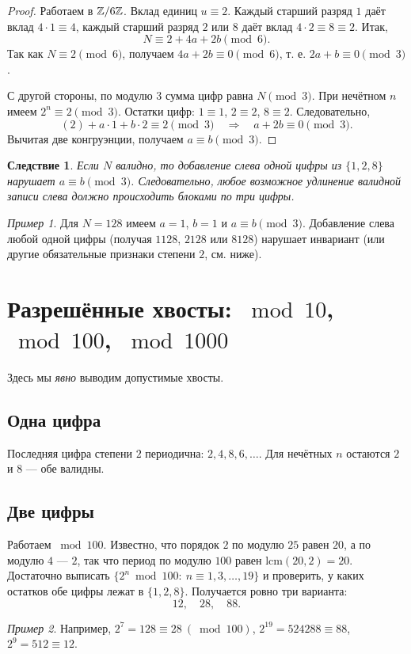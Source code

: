 \documentclass[12pt]{article}
\theoremstyle{plain}
\newtheorem{corollary}{Следствие}
\theoremstyle{remark}
\newtheorem*{example}{Пример}
\begin{document}
\begin{proof}
Работаем в $\Bbb Z/6\Bbb Z$. Вклад единиц $u\equiv2$. Каждый старший разряд $1$ даёт вклад $4\cdot1\equiv4$, каждый старший разряд $2$ или $8$ даёт вклад $4\cdot2\equiv8\equiv2$. Итак,
\[
N\equiv 2 + 4a + 2b \pmod6.
\]
Так как $N\equiv2\pmod6$, получаем $4a+2b\equiv0\pmod6$, т. е. $2a+b\equiv0\pmod3$.

С другой стороны, по модулю $3$ сумма цифр равна $N\pmod3$. При нечётном $n$ имеем $2^n\equiv2\pmod3$. Остатки цифр: $1\equiv1$, $2\equiv2$, $8\equiv2$. Следовательно,
\[
(2) + a\cdot1 + b\cdot2 \equiv 2 \pmod3 \quad\Rightarrow\quad a+2b\equiv0\pmod3.
\]
Вычитая две конгруэнции, получаем $a\equiv b\pmod3$.
\end{proof}

\begin{corollary}\label{cor:blocks}
Если $N$ валидно, то добавление слева одной цифры из $\{1,2,8\}$ нарушает $a\equiv b\pmod3$. Следовательно, любое возможное удлинение валидной записи слева должно происходить блоками по три цифры.
\end{corollary}

\begin{example}
Для $N=128$ имеем $a=1$, $b=1$ и $a\equiv b\pmod3$. Добавление слева любой одной цифры (получая $1128$, $2128$ или $8128$) нарушает инвариант (или другие обязательные признаки степени $2$, см. ниже).
\end{example}

\section{Разрешённые хвосты: \texorpdfstring{$\bmod 10$}{mod 10}, \texorpdfstring{$\bmod 100$}{mod 100}, \texorpdfstring{$\bmod 1000$}{mod 1000}}
Здесь мы \emph{явно} выводим допустимые хвосты.

\subsection*{Одна цифра}
Последняя цифра степени $2$ периодична: $2,4,8,6,\ldots$. Для нечётных $n$ остаются $2$ и $8$ — обе валидны.

\subsection*{Две цифры}
Работаем $\bmod 100$. Известно, что порядок $2$ по модулю $25$ равен $20$, а по модулю $4$ — $2$, так что период по модулю $100$ равен $\mathrm{lcm}(20,2)=20$. Достаточно выписать $\{2^n\bmod100:\ n\equiv1,3,\ldots,19\}$ и проверить, у каких остатков обе цифры лежат в $\{1,2,8\}$. Получается ровно три варианта:
\begin{equation}\label{eq:tails2}
\boxed{12,\quad 28,\quad 88.}
\end{equation}
\begin{example}
Например, $2^7=128\equiv 28\ (\bmod 100)$, $2^{19}=524288\equiv 88$, $2^9=512\equiv12$.
\end{example}
\end{document}

